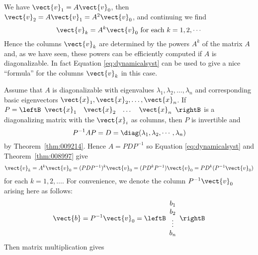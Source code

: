 We have $\vect{v}_1 = A\vect{v}_0$, then $\vect{v}_2 = A\vect{v}_1 = A^{2}\vect{v}_0$, and continuing we find
\begin{equation}\label{eq:dynamicalsyst}
\vect{v}_k = A^k \vect{v}_0 \mbox{ for each } k = 1, 2, \cdots 
\end{equation}
Hence the columns $\vect{v}_{k}$ are determined by the powers $A^{k}$ of the matrix $A$ and, as we have seen, these powers can be efficiently computed if $A$ is diagonalizable. In fact Equation \ref{eq:dynamicalsyst} can be used to give a nice ``formula'' for the columns $\vect{v}_{k}$ in this case.


Assume that $A$ is diagonalizable with eigenvalues $\lambda_{1}, \lambda_{2}, \dots ,  \lambda_{n}$ and corresponding basic eigenvectors $\vect{x}_{1}, \vect{x}_{2}, \dots , \vect{x}_{n}$. If $P = \leftB \begin{array}{cccc} \vect{x}_{1} & \vect{x}_{2} & \dots  & \vect{x}_{n} \end{array}\rightB$  is a diagonalizing matrix with the $\vect{x}_{i}$ as columns, then $P$ is invertible and
\begin{equation*}
P^{-1}AP=D = \diag(\lambda_1, \lambda_2, \cdots, \lambda_n)
\end{equation*}
by Theorem~\ref{thm:009214}. Hence $A = PDP^{-1}$ so Equation \ref{eq:dynamicalsyst} and Theorem~\ref{thm:008997} give
\begin{equation*}
\vect{v}_k = A^k \vect{v}_0 = (PDP^{-1})^k \vect{v}_0 = (PD^kP^{-1}) \vect{v}_0 = PD^k (P^{-1}\vect{v}_0)
\end{equation*}
for each $k = 1, 2, \dots$. For convenience, we denote the column $P^{-1}\vect{v}_{0}$ arising here as follows:
\begin{equation*}
\vect{b} = P^{-1} \vect{v}_0 = \leftB \begin{array}{c}
b_1 \\
b_2 \\
\vdots \\
b_n 
\end{array} \rightB
\end{equation*}
Then matrix multiplication gives
